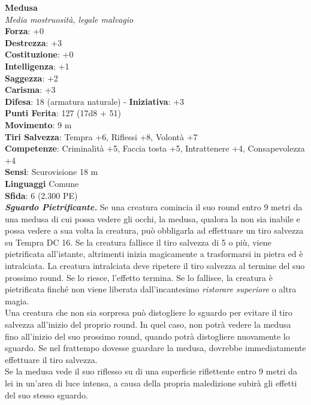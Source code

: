 \begin{multicols}{2}
\medskip\textbf{Medusa}\\
\emph{Media mostruosità, legale malvagio}\\
\textbf{Forza}: +0\\
\textbf{Destrezza}: +3\\
\textbf{Costituzione}: +0\\
\textbf{Intelligenza}: +1\\
\textbf{Saggezza}: +2\\
\textbf{Carisma}: +3\\
\textbf{Difesa}: 18 (armatura naturale) - \textbf{Iniziativa}: +3\\
\textbf{Punti Ferita}: 127 (17d8 + 51)\\
\textbf{Movimento}: 9 m\\
\textbf{Tiri Salvezza}: Tempra +6, Riflessi +8, Volontà +7\\
\textbf{Competenze}: Criminalità +5, Faccia tosta +5, Intrattenere +4, Consapevolezza +4\\
\textbf{Sensi}: Scurovisione 18 m\\
\textbf{Linguaggi} Comune\\
\textbf{Sfida}: 6 (2.300 PE)\smallskip\\
\emph{\textbf{Sguardo Pietrificante.}} Se una creatura comincia il suo round entro 9 metri da una medusa di cui possa vedere gli occhi, la medusa, qualora la non sia inabile e possa vedere a sua volta la creatura, può obbligarla ad effettuare un tiro salvezza su Tempra DC  16. Se la creatura fallisce il tiro salvezza di 5 o più, viene pietrificata all'istante, altrimenti inizia magicamente a trasformarsi in pietra ed è intralciata. La creatura intralciata deve ripetere il tiro salvezza al termine del suo prossimo round. Se lo riesce, l'effetto termina. Se lo fallisce, la creatura è pietrificata finché non viene liberata dall'incantesimo \emph{ristorare superiore} o altra magia.\\
Una creatura che non sia sorpresa può distogliere lo sguardo per evitare il tiro salvezza all'inizio del proprio round. In quel caso, non potrà vedere la medusa fino all'inizio del suo prossimo round, quando potrà distogliere nuovamente lo sguardo. Se nel frattempo dovesse guardare la medusa, dovrebbe immediatamente effettuare il tiro salvezza.\\
Se la medusa vede il suo riflesso su di una superficie riflettente entro 9 metri da lei in un'area di luce intensa, a causa della propria maledizione subirà gli effetti del suo stesso sguardo.\\


\end{multicols}
